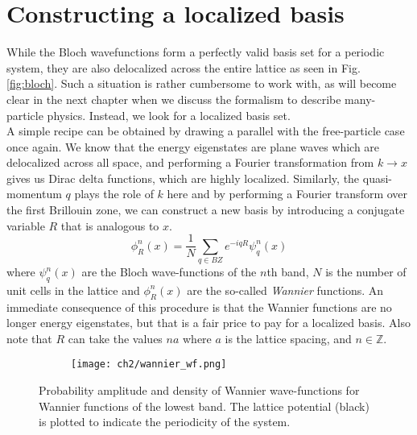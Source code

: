 \section{Constructing a localized basis}
While the Bloch wavefunctions form a perfectly valid basis set for a periodic system, they are also delocalized across the entire lattice as seen in Fig. \ref{fig:bloch}. Such a situation is rather cumbersome to work with, as will become clear in the next chapter when we discuss the formalism to describe many-particle physics. Instead, we look for a localized basis set.  
\vspace{0.5cm}\\
A simple recipe can be obtained by drawing a parallel with the free-particle case once again. We know that the energy eigenstates are plane waves which are delocalized across all space, and performing a Fourier transformation from $k \to x$ gives us Dirac delta functions, which are highly localized. Similarly, the quasi-momentum $q$ plays the role of $k$ here and by performing a Fourier transform over the first Brillouin zone, we can construct a new basis by introducing a conjugate variable $R$ that is analogous to $x$. 
\begin{equation}
    \phi^n_R(x) = \frac{1}{N}\sum_{q \in BZ} e^{-iqR} \psi_q^n(x)
\end{equation}
where $\psi_q^n(x)$ are the Bloch wave-functions of the $n$th band, $N$ is the number of unit cells in the lattice and $\phi_R^n(x)$ are the so-called \textit{Wannier} functions. An immediate consequence of this procedure is that the Wannier functions are no longer energy eigenstates, but that is a fair price to pay for a localized basis. Also note that $R$ can take the values $na$ where $a$ is the lattice spacing, and $n \in \mathbb{Z}$.
\begin{figure}[!htb]
    \centering
    \begin{subfigure}[b]{\textwidth}  %
        \centering
        \texttt{[image: ch2/wannier\_wf.png]}
    \end{subfigure}
    \caption{Probability amplitude and density of Wannier wave-functions for Wannier functions of the lowest band. The lattice potential (black) is plotted to indicate the periodicity of the system.}
    \label{fig:wannier}
\end{figure}
\FloatBarrier \!\!\!\!\!\!\!\!\!\!\!

